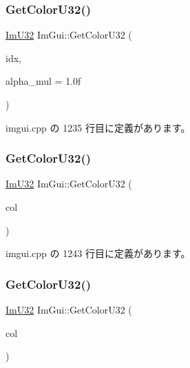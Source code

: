 \subsubsection{\texorpdfstring{Get\+Color\+U32()}{GetColorU32()}\hspace{0.1cm}{\footnotesize\ttfamily [1/3]}}
{\footnotesize\ttfamily \mbox{\hyperlink{imgui_8h_a118cff4eeb8d00e7d07ce3d6460eed36}{Im\+U32}} Im\+Gui\+::\+Get\+Color\+U32 (\begin{DoxyParamCaption}\item[{\mbox{\hyperlink{imgui_8h_a1b0467ec582e731ae6292fef726fb5fe}{Im\+Gui\+Col}}}]{idx,  }\item[{float}]{alpha\+\_\+mul = {\ttfamily 1.0f} }\end{DoxyParamCaption})}



 imgui.\+cpp の 1235 行目に定義があります。

\mbox{\label{namespace_im_gui_ac701752365ddd58cecc1956fc62921a8}} 
\subsubsection{\texorpdfstring{Get\+Color\+U32()}{GetColorU32()}\hspace{0.1cm}{\footnotesize\ttfamily [2/3]}}
{\footnotesize\ttfamily \mbox{\hyperlink{imgui_8h_a118cff4eeb8d00e7d07ce3d6460eed36}{Im\+U32}} Im\+Gui\+::\+Get\+Color\+U32 (\begin{DoxyParamCaption}\item[{const \mbox{\hyperlink{struct_im_vec4}{Im\+Vec4}} \&}]{col }\end{DoxyParamCaption})}



 imgui.\+cpp の 1243 行目に定義があります。

\mbox{\label{namespace_im_gui_a834649713437e8fdfa0e5a4fb780d35b}} 
\subsubsection{\texorpdfstring{Get\+Color\+U32()}{GetColorU32()}\hspace{0.1cm}{\footnotesize\ttfamily [3/3]}}
{\footnotesize\ttfamily \mbox{\hyperlink{imgui_8h_a118cff4eeb8d00e7d07ce3d6460eed36}{Im\+U32}} Im\+Gui\+::\+Get\+Color\+U32 (\begin{DoxyParamCaption}\item[{\mbox{\hyperlink{imgui_8h_a118cff4eeb8d00e7d07ce3d6460eed36}{Im\+U32}}}]{col }\end{DoxyParamCaption})}



